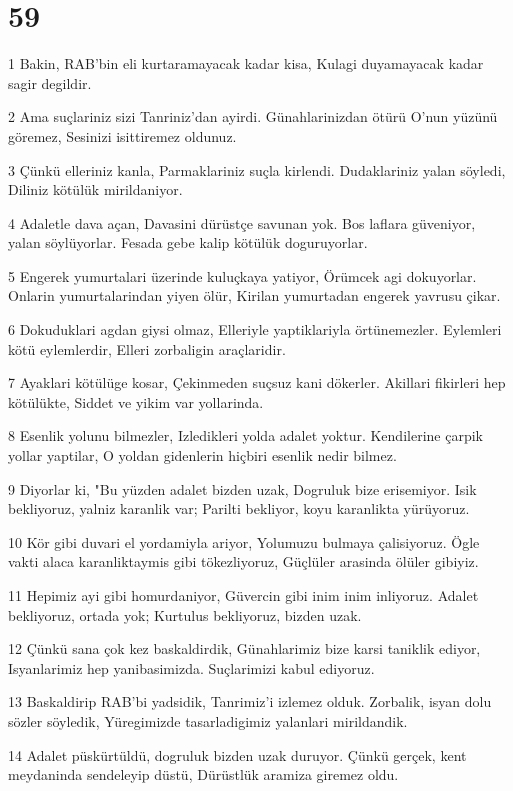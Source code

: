 \chapter{59}

\par 1 Bakin, RAB'bin eli kurtaramayacak kadar kisa, Kulagi duyamayacak kadar sagir degildir.
\par 2 Ama suçlariniz sizi Tanriniz'dan ayirdi. Günahlarinizdan ötürü O'nun yüzünü göremez, Sesinizi isittiremez oldunuz.
\par 3 Çünkü elleriniz kanla, Parmaklariniz suçla kirlendi. Dudaklariniz yalan söyledi, Diliniz kötülük mirildaniyor.
\par 4 Adaletle dava açan, Davasini dürüstçe savunan yok. Bos laflara güveniyor, yalan söylüyorlar. Fesada gebe kalip kötülük doguruyorlar.
\par 5 Engerek yumurtalari üzerinde kuluçkaya yatiyor, Örümcek agi dokuyorlar. Onlarin yumurtalarindan yiyen ölür, Kirilan yumurtadan engerek yavrusu çikar.
\par 6 Dokuduklari agdan giysi olmaz, Elleriyle yaptiklariyla örtünemezler. Eylemleri kötü eylemlerdir, Elleri zorbaligin araçlaridir.
\par 7 Ayaklari kötülüge kosar, Çekinmeden suçsuz kani dökerler. Akillari fikirleri hep kötülükte, Siddet ve yikim var yollarinda.
\par 8 Esenlik yolunu bilmezler, Izledikleri yolda adalet yoktur. Kendilerine çarpik yollar yaptilar, O yoldan gidenlerin hiçbiri esenlik nedir bilmez.
\par 9 Diyorlar ki, "Bu yüzden adalet bizden uzak, Dogruluk bize erisemiyor. Isik bekliyoruz, yalniz karanlik var; Parilti bekliyor, koyu karanlikta yürüyoruz.
\par 10 Kör gibi duvari el yordamiyla ariyor, Yolumuzu bulmaya çalisiyoruz. Ögle vakti alaca karanliktaymis gibi tökezliyoruz, Güçlüler arasinda ölüler gibiyiz.
\par 11 Hepimiz ayi gibi homurdaniyor, Güvercin gibi inim inim inliyoruz. Adalet bekliyoruz, ortada yok; Kurtulus bekliyoruz, bizden uzak.
\par 12 Çünkü sana çok kez baskaldirdik, Günahlarimiz bize karsi taniklik ediyor, Isyanlarimiz hep yanibasimizda. Suçlarimizi kabul ediyoruz.
\par 13 Baskaldirip RAB'bi yadsidik, Tanrimiz'i izlemez olduk. Zorbalik, isyan dolu sözler söyledik, Yüregimizde tasarladigimiz yalanlari mirildandik.
\par 14 Adalet püskürtüldü, dogruluk bizden uzak duruyor. Çünkü gerçek, kent meydaninda sendeleyip düstü, Dürüstlük aramiza giremez oldu.
